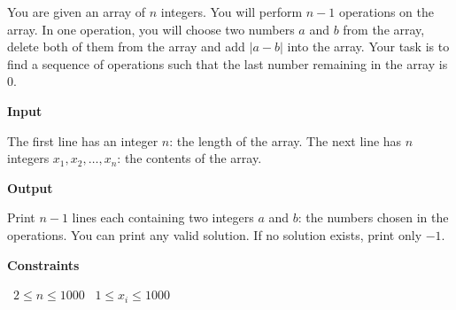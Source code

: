 You are given an array of $n$ integers. You will perform $n-1$ operations on the array.
In one operation, you will choose two numbers $a$ and $b$ from the array, delete both of them from the array and add $|a - b|$ into the array.
Your task is to find a sequence of operations such that the last number remaining in the array is $0$.

\vspace{0.3cm}\noindent\textbf{Input}

The first line has an integer $n$: the length of the array.
The next line has $n$ integers $x_1, x_2,\dots, x_n$: the contents of the array.

\vspace{0.3cm}\noindent\textbf{Output}

Print $n-1$ lines each containing two integers $a$ and $b$: the numbers chosen in the operations. You can print any valid solution.
If no solution exists, print only $-1$.

\vspace{0.3cm}\noindent\textbf{Constraints}

\textbullet\ $2 \le n \le 1000$
\textbullet\ $1 \le x_i \le 1000$